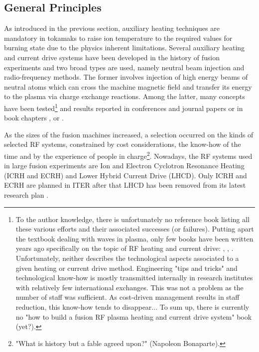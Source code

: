 \subsection{General Principles}
As introduced in the previous section, auxiliary heating techniques are mandatory in tokamaks to raise ion temperature to the required values for burning state due to the physics inherent limitations. Several auxiliary heating and current drive systems have been developed in the history of fusion experiments and two broad types are used, namely neutral beam injection and radio-frequency methods. %
The former involves  injection of high energy beams of neutral atoms which can cross the machine magnetic field and transfer its energy to the plasma via charge exchange reactions. Among the latter, many concepts have been tested\footnote{To the author knowledge, there is unfortunately no reference book listing all these various efforts and their associated successes (or failures). Putting apart the textbook dealing with waves in plasma, only few books have been written years ago specifically on the topic of RF heating and current drive: , , . Unfortunately, neither describes the technological aspects associated to a given heating or current drive method. Engineering "tips and tricks" and technological know-how is mostly transmitted internally in research institutes with relatively few international exchanges. This was not a problem as the number of staff was sufficient. As cost-driven management results in staff reduction, this know-how tends to disappear... To sum up, there is currently no "how to build a fusion RF plasma heating and current drive system" book (yet?).} and results reported in conferences and journal papers  or in book chapters \cite[§6]{kikuchi2012}, \cite[§15]{Freidberg2007} or \cite{hillairet2020-1}. 

As the sizes of the fusion machines increased, a selection occurred on the kinds of selected RF systems, constrained by cost considerations, the know-how of the time and by the experience of people in charge\footnote{"What is history but a fable agreed upon?" (Napoleon Bonaparte).}. Nowadays, the RF systems used in large fusion experiments are Ion and Electron Cyclotron Resonance Heating (ICRH and ECRH) and Lower Hybrid Current Drive (LHCD). Only ICRH and ECRH are planned in ITER after that LHCD has been removed from its latest research plan \cite{iterorganization2018}. 

